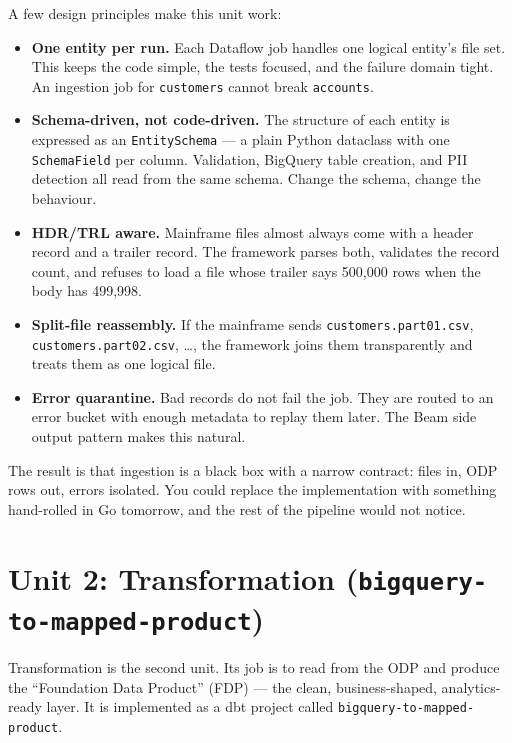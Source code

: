 \documentclass[
  11pt,
  british,
  oneside]{book}
\providecommand{\tightlist}{%
  \setlength{\itemsep}{0pt}\setlength{\parskip}{0pt}}
\begin{document}
A few design principles make this unit work:

\begin{itemize}
\tightlist
\item
  \textbf{One entity per run.} Each Dataflow job handles one logical
  entity's file set. This keeps the code simple, the tests focused, and
  the failure domain tight. An ingestion job for \texttt{customers}
  cannot break \texttt{accounts}.
\item
  \textbf{Schema-driven, not code-driven.} The structure of each entity
  is expressed as an \texttt{EntitySchema}
  --- a plain Python dataclass with one
  \texttt{SchemaField} per column. Validation,
  BigQuery table creation, and PII detection all read from the same
  schema. Change the schema, change the behaviour.
\item
  \textbf{HDR/TRL aware.} Mainframe files almost always come with a
  header record and a trailer record. The framework parses both,
  validates the record count, and refuses to load a file whose trailer
  says 500,000 rows when the body has 499,998.
\item
  \textbf{Split-file reassembly.} If the
  mainframe sends \texttt{customers.part01.csv},
  \texttt{customers.part02.csv}, \ldots, the framework joins them
  transparently and treats them as one logical file.
\item
  \textbf{Error quarantine.} Bad records do not fail the job. They are
  routed to an error bucket with enough metadata to replay them later.
  The Beam side output pattern makes this natural.
\end{itemize}

The result is that ingestion is a black box with a narrow contract:
files in, ODP rows out, errors isolated. You could replace the
implementation with something hand-rolled in Go tomorrow, and the rest
of the pipeline would not notice.

\hypertarget{unit-2-transformation-bigquery-to-mapped-product}{%
\section{\texorpdfstring{Unit 2: Transformation
(\texttt{bigquery-to-mapped-product})}{Unit 2: Transformation (bigquery-to-mapped-product)}}\label{unit-2-transformation-bigquery-to-mapped-product}}

Transformation is the second unit. Its job is to read from the ODP and
produce the ``Foundation Data Product'' (FDP) --- the clean,
business-shaped, analytics-ready layer. It is implemented as a dbt
project called \texttt{bigquery-to-mapped-product}.
\end{document}
